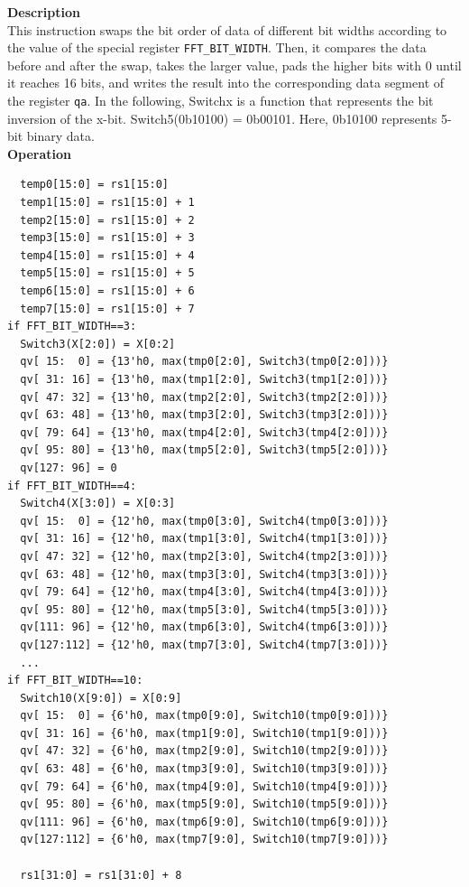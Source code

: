 \textbf{Description}\\
This instruction swaps the bit order of data of different bit widths according to the value of the special register \lstinline{FFT_BIT_WIDTH}. Then, it compares the data before and after the swap, takes the larger value, pads the higher bits with 0 until it reaches 16 bits, and writes the result into the corresponding data segment of the register \lstinline{qa}. In the following, Switchx is a function that represents the bit inversion of the x-bit. Switch5(0b10100) = 0b00101. Here, 0b10100 represents 5-bit binary data.\\

\textbf{Operation}\\
\begin{lstlisting}
  temp0[15:0] = rs1[15:0]
  temp1[15:0] = rs1[15:0] + 1
  temp2[15:0] = rs1[15:0] + 2
  temp3[15:0] = rs1[15:0] + 3
  temp4[15:0] = rs1[15:0] + 4
  temp5[15:0] = rs1[15:0] + 5
  temp6[15:0] = rs1[15:0] + 6
  temp7[15:0] = rs1[15:0] + 7
if FFT_BIT_WIDTH==3:
  Switch3(X[2:0]) = X[0:2]
  qv[ 15:  0] = {13'h0, max(tmp0[2:0], Switch3(tmp0[2:0]))}
  qv[ 31: 16] = {13'h0, max(tmp1[2:0], Switch3(tmp1[2:0]))}
  qv[ 47: 32] = {13'h0, max(tmp2[2:0], Switch3(tmp2[2:0]))}
  qv[ 63: 48] = {13'h0, max(tmp3[2:0], Switch3(tmp3[2:0]))}
  qv[ 79: 64] = {13'h0, max(tmp4[2:0], Switch3(tmp4[2:0]))}
  qv[ 95: 80] = {13'h0, max(tmp5[2:0], Switch3(tmp5[2:0]))}
  qv[127: 96] = 0
if FFT_BIT_WIDTH==4:
  Switch4(X[3:0]) = X[0:3]
  qv[ 15:  0] = {12'h0, max(tmp0[3:0], Switch4(tmp0[3:0]))}
  qv[ 31: 16] = {12'h0, max(tmp1[3:0], Switch4(tmp1[3:0]))}
  qv[ 47: 32] = {12'h0, max(tmp2[3:0], Switch4(tmp2[3:0]))}
  qv[ 63: 48] = {12'h0, max(tmp3[3:0], Switch4(tmp3[3:0]))}
  qv[ 79: 64] = {12'h0, max(tmp4[3:0], Switch4(tmp4[3:0]))}
  qv[ 95: 80] = {12'h0, max(tmp5[3:0], Switch4(tmp5[3:0]))}
  qv[111: 96] = {12'h0, max(tmp6[3:0], Switch4(tmp6[3:0]))}
  qv[127:112] = {12'h0, max(tmp7[3:0], Switch4(tmp7[3:0]))}
  ...
if FFT_BIT_WIDTH==10:
  Switch10(X[9:0]) = X[0:9]
  qv[ 15:  0] = {6'h0, max(tmp0[9:0], Switch10(tmp0[9:0]))}
  qv[ 31: 16] = {6'h0, max(tmp1[9:0], Switch10(tmp1[9:0]))}
  qv[ 47: 32] = {6'h0, max(tmp2[9:0], Switch10(tmp2[9:0]))}
  qv[ 63: 48] = {6'h0, max(tmp3[9:0], Switch10(tmp3[9:0]))}
  qv[ 79: 64] = {6'h0, max(tmp4[9:0], Switch10(tmp4[9:0]))}
  qv[ 95: 80] = {6'h0, max(tmp5[9:0], Switch10(tmp5[9:0]))}
  qv[111: 96] = {6'h0, max(tmp6[9:0], Switch10(tmp6[9:0]))}
  qv[127:112] = {6'h0, max(tmp7[9:0], Switch10(tmp7[9:0]))}

  rs1[31:0] = rs1[31:0] + 8
\end{lstlisting}

